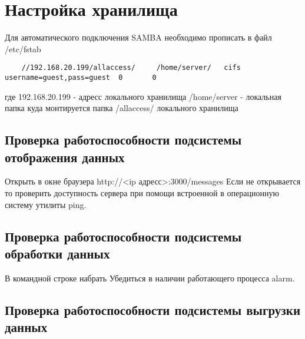 \documentclass[12pt]{article}[a4paper,14pt,russian]
\begin{document}
	\section{Настройка хранилища}
	Для автоматического подключения SAMBA необходимо прописать в файл
	/etc/fstab
	\begin{verbatim}
	//192.168.20.199/allaccess/     /home/server/   cifs username=guest,pass=guest  0       0
	\end{verbatim}
	где 192.168.20.199 - адресс локального хранилища
	/home/server - локальная папка куда монтируется папка /allaccess/ локального хранилища
	\subsection{Проверка работоспособности подсистемы отображения данных}
	Открыть в окне браузера http://<ip адресс>:3000/messages
	Если не открывается то проверить доступность сервера при
	помощи встроенной в операционную систему утилиты ping.
	
    \subsection{Проверка работоспособности подсистемы обработки данных}
    В командной строке набрать 
    Убедиться в наличии работающего процесса alarm.
    \subsection{Проверка работоспособности подсистемы выгрузки данных}
\end{document}
